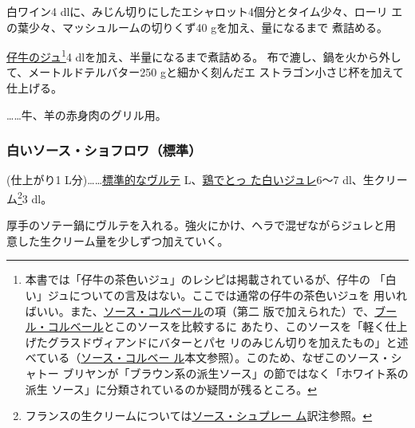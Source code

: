 \begin{recette}
白ワイン4 dlに、みじん切りにしたエシャロット4個分とタイム少々、ローリ
エの葉少々、マッシュルームの切りくず40 gを加え、\untiers{}量になるまで
煮詰める。

\protect\hyperlink{jus-de-veau-brun}{仔牛のジュ}\footnote{本書では「仔牛の茶色いジュ」のレシピは掲載されているが、仔牛の
  「白い」ジュについての言及はない。ここでは通常の仔牛の茶色いジュを
  用いればいい。また、\protect\hyperlink{sauce-colbert}{ソース・コルベール}の項（第二
  版で加えられた）で、\protect\hyperlink{beurre-colbert}{ブール・コルベール}とこのソースを比較するに
  あたり、このソースを「軽く仕上げたグラスドヴィアンドにバターとパセ
  リのみじん切りを加えたもの」と述べている（\protect\hyperlink{sauce-colbert}{ソース・コルベー
  ル}本文参照）。このため、なぜこのソース・シャトー
  ブリヤンが「ブラウン系の派生ソース」の節ではなく「ホワイト系の派生
  ソース」に分類されているのか疑問が残るところ。}4
dlを加え、半量になるまで煮詰める。
布で漉し、鍋を火から外して、メートルドテルバター250 gと細かく刻んだエ
ストラゴン小さじ\undemi{}杯を加えて仕上げる。

\ldots{}\ldots{}牛、羊の赤身肉のグリル用。

\maeaki

\hypertarget{sauce-chaud-froid-blanche-ordinaire}{%
\subsubsection{白いソース・ショフロワ（標準）}\label{sauce-chaud-froid-blanche-ordinaire}}



(仕上がり1
L分)\ldots{}\ldots{}\protect\hyperlink{veloute}{標準的なヴルテ}\troisquarts{}
L、\protect\hyperlink{gelee-de-volaille}{鶏でとっ た白いジュレ}6〜7
dl、生クリーム\footnote{フランスの生クリームについては\protect\hyperlink{sauce-supreme}{ソース・シュプレー
  ム}訳注参照。}3 dl。

厚手のソテー鍋にヴルテを入れる。強火にかけ、ヘラで混ぜながらジュレと用
意した生クリーム\untiers{}量を少しずつ加えていく。


\end{recette}
